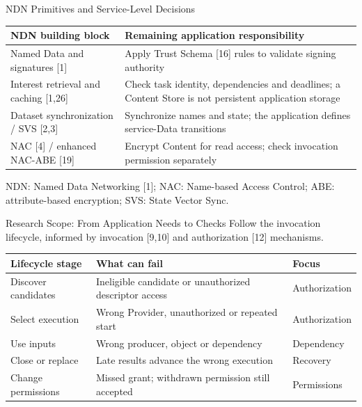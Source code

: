 \begin{frame}{NDN Primitives and Service-Level Decisions}
\small
\begin{tabularx}{\linewidth}{p{.39\linewidth}X}
\toprule NDN building block & Remaining application responsibility\\\midrule
Named Data and signatures [1] & Apply Trust Schema [16] rules to validate signing authority\\\midrule
Interest retrieval and caching [1,26] & Check task identity, dependencies and deadlines; a Content Store is not persistent application storage\\\midrule
Dataset synchronization / SVS [2,3] & Synchronize names and state; the application defines service-Data transitions\\\midrule
NAC [4] / enhanced NAC-ABE [19] & Encrypt Content for read access; check invocation permission separately\\\bottomrule
\end{tabularx}
\vspace{2mm}\scriptsize NDN: Named Data Networking [1]; NAC: Name-based Access Control; ABE: attribute-based encryption; SVS: State Vector Sync.
\vspace{2mm}
\end{frame}

\begin{frame}{Research Scope: From Application Needs to Checks}
\small
Follow the invocation lifecycle, informed by invocation [9,10] and authorization [12] mechanisms.
\par\vspace{2mm}
\begin{tabularx}{\linewidth}{p{.25\linewidth}Xp{.14\linewidth}}
\toprule Lifecycle stage & What can fail & Focus\\\midrule
Discover candidates & Ineligible candidate or unauthorized descriptor access & Authorization\\\midrule
Select execution & Wrong Provider, unauthorized or repeated start & Authorization\\\midrule
Use inputs & Wrong producer, object or dependency & Dependency\\\midrule
Close or replace & Late results advance the wrong execution & Recovery\\\midrule
Change permissions & Missed grant; withdrawn permission still accepted & Permissions\\\bottomrule
\end{tabularx}
\vspace{2mm}
\end{frame}

